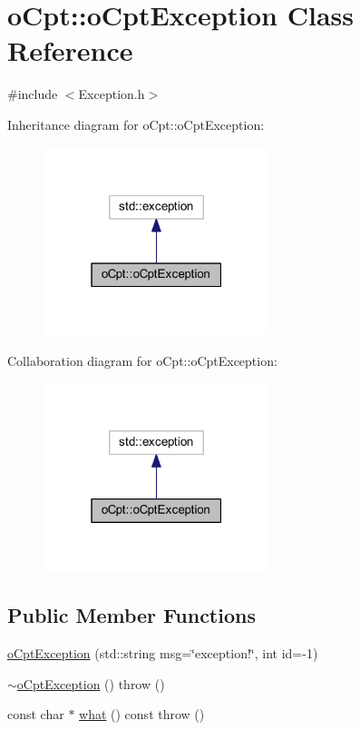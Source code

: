 \hypertarget{classo_cpt_1_1o_cpt_exception}{}\section{o\+Cpt\+:\+:o\+Cpt\+Exception Class Reference}
\label{classo_cpt_1_1o_cpt_exception}


{\ttfamily \#include $<$Exception.\+h$>$}



Inheritance diagram for o\+Cpt\+:\+:o\+Cpt\+Exception\+:
\nopagebreak
\begin{figure}[H]
\begin{center}
\leavevmode
\includegraphics[width=187pt]{classo_cpt_1_1o_cpt_exception__inherit__graph}
\end{center}
\end{figure}


Collaboration diagram for o\+Cpt\+:\+:o\+Cpt\+Exception\+:
\nopagebreak
\begin{figure}[H]
\begin{center}
\leavevmode
\includegraphics[width=187pt]{classo_cpt_1_1o_cpt_exception__coll__graph}
\end{center}
\end{figure}
\subsection*{Public Member Functions}
\begin{DoxyCompactItemize}
\item 
\hyperlink{classo_cpt_1_1o_cpt_exception_a208458b2a2bf67fc8ca289b469e59cdf}{o\+Cpt\+Exception} (std\+::string msg=\char`\"{}exception!\char`\"{}, int id=-\/1)
\item 
\hyperlink{classo_cpt_1_1o_cpt_exception_a4083ed2718d9bdf097874c98aab69804}{$\sim$o\+Cpt\+Exception} ()  throw ()
\item 
const char $\ast$ \hyperlink{classo_cpt_1_1o_cpt_exception_af6584a121c1d0b6723d42264b2d665e3}{what} () const   throw ()
\end{DoxyCompactItemize}


